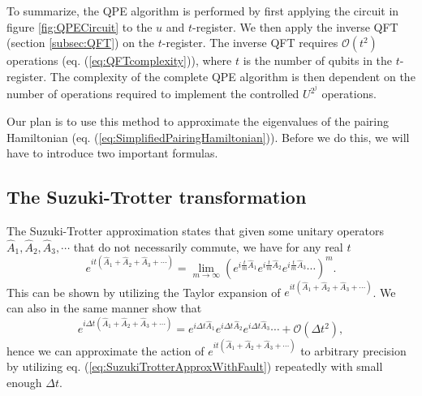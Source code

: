 \bigskip
\noindent
To summarize, the QPE algorithm is performed by first applying the circuit in figure \ref{fig:QPECircuit} to the $u$ and $t$-register. We then apply the inverse QFT (section \ref{subsec:QFT}) on the $t$-register. The inverse QFT requires $\mathcal{O}(t^2)$ operations (eq. (\ref{eq:QFTcomplexity})), where $t$ is the number of qubits in the $t$-register. The complexity of the complete QPE algorithm is then dependent on the number of operations required to implement the controlled $U^{2^j}$ operations.

Our plan is to use this method to approximate the eigenvalues of the pairing Hamiltonian (eq. (\ref{eq:SimplifiedPairingHamiltonian})). Before we do this, we will have to introduce two important formulas.

\subsection{The Suzuki-Trotter transformation}
\label{subsec:SuzukiTrotter}
The Suzuki-Trotter approximation states that given some unitary operators $\hat{A}_1, \hat{A}_2, \hat{A}_3,\cdots$ that do not necessarily commute, we have for any real $t$
\begin{equation}
    \label{eq:SuzukiTrotterApprox}
    e^{it(\hat{A}_1 + \hat{A}_2 + \hat{A}_3 + \cdots)} = \lim_{m\rightarrow \infty} (e^{i\frac{t}{m}\hat{A}_1}e^{i\frac{t}{m}\hat{A}_2}e^{i\frac{t}{m}\hat{A}_3}\cdots)^m.
\end{equation}
This can be shown by utilizing the Taylor expansion of $e^{it(\hat{A}_1 + \hat{A}_2 + \hat{A}_3 + \cdots)}$. We can also in the same manner show that \cite{NielsenAndChuang}
\begin{equation}
    \label{eq:SuzukiTrotterApproxWithFault}
    e^{i\Delta t(\hat{A}_1 + \hat{A}_2 + \hat{A}_3 + \cdots)} =  e^{i\Delta t\hat{A}_1}e^{i\Delta t\hat{A}_2}e^{i\Delta t \hat{A}_3}\cdots + \mathcal{O}(\Delta t^2 ),
\end{equation}
hence we can approximate the action of $e^{it(\hat{A}_1 + \hat{A}_2 + \hat{A}_3 + \cdots)}$ to arbitrary precision by utilizing eq. (\ref{eq:SuzukiTrotterApproxWithFault}) repeatedly with small enough $\Delta t$.

